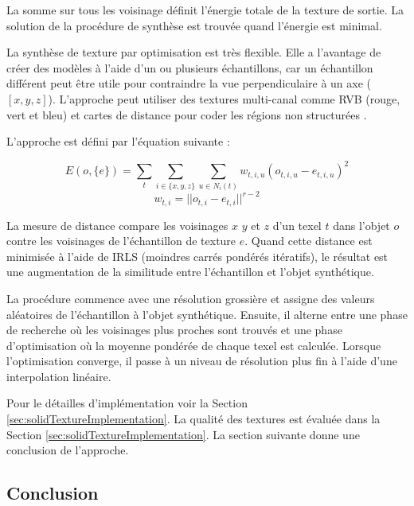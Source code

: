 La somme sur tous les voisinage définit l'énergie totale de la texture de sortie.
La solution de la procédure de synthèse est trouvée quand
l'énergie est minimal.

La synthèse de texture par optimisation est très flexible.
Elle a l'avantage de créer des modèles à l'aide d'un ou plusieurs échantillons, car 
un échantillon différent peut être utile pour 
contraindre la vue perpendiculaire à un axe ($[x, y, z]$).
L'approche peut utiliser des textures multi-canal comme RVB (rouge, vert et bleu) et 
cartes de distance pour coder les régions non structurées \cite{Lefebvre:2006:ATS:1141911.1141921}.

L'approche est défini par l'équation suivante :

\begin{equation}
 E(o, \{e\} ) = \sum_{t} \sum_{i \in \{x, y, z\}} \sum_{u \in N_i(t)} w_{t, i, u} ( o_{t, i, u} - e_{t, i, u} )^2
 \label{equ:imagenergyfr} 
\end{equation}
\begin{equation}
 w_{t,i} = || o_{t, i} - e_{t, i} ||^{r - 2}
 \label{equ:neighweightfr}
\end{equation}

La mesure de distance compare les voisinages $x$ $y$ et $z$ 
d'un texel $t$ dans l'objet $o$ contre les voisinages de l'échantillon de texture $e$.
Quand cette distance est minimisée à l'aide de IRLS (moindres carrés pondérés itératifs),
le résultat est une augmentation de la similitude entre l'échantillon et l'objet synthétique.

La procédure commence avec une résolution grossière et assigne des valeurs aléatoires de l'échantillon à l'objet synthétique.
Ensuite, il alterne entre une phase de recherche où les voisinages plus proches sont trouvés 
et une phase d'optimisation où la moyenne pondérée de chaque texel est calculée.
Lorsque l'optimisation converge, il passe à un niveau de résolution plus fin à l'aide d'une interpolation linéaire.

Pour le détailles d'implémentation voir la Section \ref{sec:solidTextureImplementation}. 
La qualité des textures est évaluée
dans la Section \ref{sec:solidTextureImplementation}.
La section suivante donne une conclusion de l'approche.


\subsection{Conclusion}
\label{sec:conclusions}

